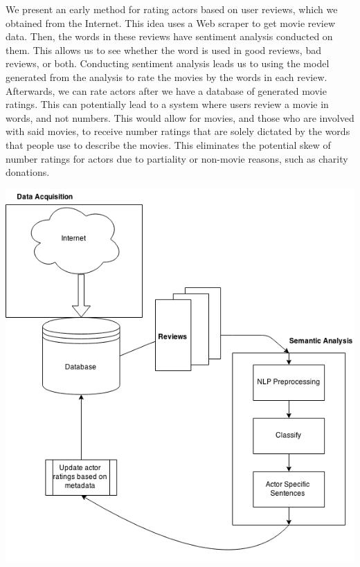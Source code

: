 \documentclass[a0,portrait]{a0poster}
\begin{document}
\begin{multicols}{2}
We present an early method for rating actors based on user reviews, which we obtained from the Internet. This idea uses a Web scraper to get movie review data.  Then, the words in these reviews have sentiment analysis conducted on them.  This allows us to see whether the word is used in good reviews, bad reviews, or both.  Conducting sentiment analysis leads us to using the model generated from the analysis to rate the movies by the words in each review.  Afterwards, we can rate actors after we have a database of generated movie ratings.  This can potentially lead to a system where users review a movie in words, and not numbers.  This would allow for movies, and those who are involved with said movies, to receive number ratings that are solely dictated by the words that people use to describe the movies.  This eliminates the potential skew of number ratings for actors due to partiality or non-movie reasons, such as charity donations.


\begin{center}\vspace{1cm}
\includegraphics[width=0.8\linewidth]{flow2}
\end{center}\vspace{1cm}



\end{multicols}
\end{document}
